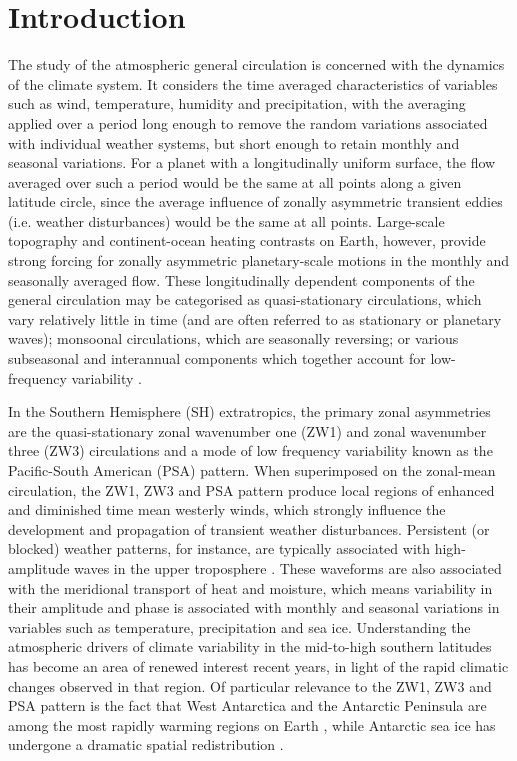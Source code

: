 
\chapter{Introduction}


The study of the atmospheric general circulation is concerned with the dynamics of the climate system. It considers the time averaged characteristics of variables such as wind, temperature, humidity and precipitation, with the averaging applied over a period long enough to remove the random variations associated with individual weather systems, but short enough to retain monthly and seasonal variations. For a planet with a longitudinally uniform surface, the flow averaged over such a period would be the same at all points along a given latitude circle, since the average influence of zonally asymmetric transient eddies (i.e. weather disturbances) would be the same at all points. Large-scale topography and continent-ocean heating contrasts on Earth, however, provide strong forcing for zonally asymmetric planetary-scale motions in the monthly and seasonally averaged flow. These longitudinally dependent components of the general circulation may be categorised as quasi-stationary circulations, which vary relatively little in time (and are often referred to as stationary or planetary waves); monsoonal circulations, which are seasonally reversing; or various subseasonal and interannual components which together account for low-frequency variability \citep{Holton2013}. 

In the Southern Hemisphere (SH) extratropics, the primary zonal asymmetries are the quasi-stationary zonal wavenumber one (ZW1) and zonal wavenumber three (ZW3) circulations and a mode of low frequency variability known as the Pacific-South American (PSA) pattern. When superimposed on the zonal-mean circulation, the ZW1, ZW3 and PSA pattern produce local regions of enhanced and diminished time mean westerly winds, which strongly influence the development and propagation of transient weather disturbances. Persistent (or blocked) weather patterns, for instance, are typically associated with high-amplitude waves in the upper troposphere \citep[e.g.][]{Trenberth1985,Renwick2005}. These waveforms are also associated with the meridional transport of heat and moisture, which means variability in their amplitude and phase is associated with monthly and seasonal variations in variables such as temperature, precipitation and sea ice. Understanding the atmospheric drivers of climate variability in the mid-to-high southern latitudes has become an area of renewed interest recent years, in light of the rapid climatic changes observed in that region. Of particular relevance to the ZW1, ZW3 and PSA pattern is the fact that West Antarctica and the Antarctic Peninsula are among the most rapidly warming regions on Earth \citep[e.g.][]{Nicolas2014}, while Antarctic sea ice has undergone a dramatic spatial redistribution \citep[e.g.][]{Simmonds2015}. 

